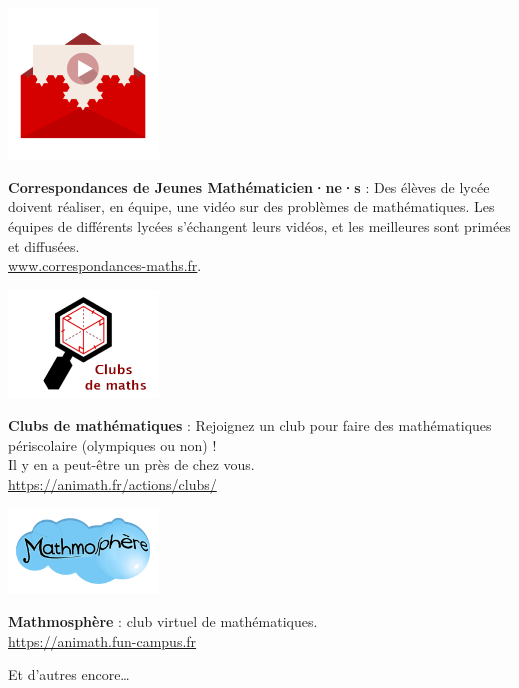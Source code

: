 \begin{minipage}[c]{.46\linewidth}
\includegraphics[width=40mm]{01-Intro/logos/correspondances.png}
\end{minipage}
\begin{minipage}[c]{.46\linewidth}	
\textbf{Correspondances de Jeunes Mathématicien·ne·s} :
Des élèves de lycée doivent réaliser, en équipe, une vidéo sur des problèmes de mathématiques. Les équipes de différents lycées s'échangent leurs vidéos, et les meilleures sont primées et diffusées.
\\ \url{www.correspondances-maths.fr}.
\end{minipage} \hfill


\vspace{4mm}



\begin{minipage}[c]{.46\linewidth}
\includegraphics[width=40mm]{01-Intro/logos/clubs_de_maths.png}
\end{minipage}
\begin{minipage}[c]{.46\linewidth}	
\textbf{Clubs de mathématiques} :
Rejoignez un club pour faire des mathématiques périscolaire (olympiques ou non) ! \\ Il y en a peut-être un près de chez vous.
\\
\url{https://animath.fr/actions/clubs/}

\end{minipage} \hfill

		
	
\vspace{4mm}



\begin{minipage}[c]{.46\linewidth}
\includegraphics[width=40mm]{01-Intro/logos/mathmosphere.png}
\end{minipage}
\begin{minipage}[c]{.46\linewidth}	
\textbf{Mathmosphère} : club virtuel de mathématiques.
\\
\url{https://animath.fun-campus.fr}

\end{minipage} \hfill
\vspace{16mm}

Et d'autres encore…

\vfill
		
	
\pagebreak
